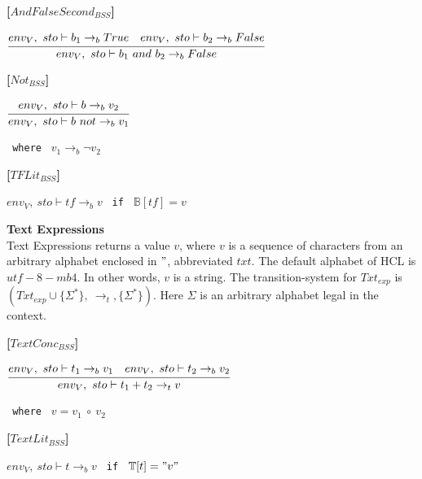 \textbf{[$AndFalseSecond_{BSS}$]}\\
\begin{center}
	\begin{math}
	\cfrac
	{env_V,\ sto \vdash b_1 \rightarrow_b True \quad env_V,\ sto \vdash b_2 \rightarrow_b False}
	{env_V,\ sto \vdash b_1\ and\ b_2 \rightarrow_b False}
	\end{math}
\end{center}

\textbf{[$Not_{BSS}$]}\\
\begin{center}
	\begin{math}
	\cfrac
	{env_V,\ sto \vdash b \rightarrow_b v_2}
	{env_V,\ sto \vdash b\ not \rightarrow_b v_1}
	\end{math}
	
	\texttt{ where } $v_1 \rightarrow_b \neg v_2$
\end{center}

\textbf{[$TFLit_{BSS}$]}\\
\begin{center}
	\begin{math}
	env_V,\ sto \vdash tf \rightarrow_b v
	\end{math}
	\texttt{ if } $\mathbb{B}[tf] = v$
\end{center}

\textbf{\large{Text Expressions}}\\
Text Expressions returns a value $v$, where $v$ is a sequence of characters from an arbitrary alphabet enclosed in $"$, abbreviated $txt$.
The default alphabet of HCL is $utf-8-mb4$.
In other words, $v$ is a string.
The transition-system for $Txt_{exp}$ is $(Txt_{exp} \cup \{\Sigma^*\},\ \rightarrow_t, \{\Sigma^*\})$.
Here $\Sigma$ is an arbitrary alphabet legal in the context.

\textbf{[$TextConc_{BSS}$]}\\
\begin{center}
	\begin{math}
	\cfrac
		{env_V,\ sto \vdash t_1 \rightarrow_b v_1 \quad env_V,\ sto \vdash t_2 \rightarrow_b v_2}
		{env_V,\ sto \vdash t_1 + t_2 \rightarrow_t v}
	\end{math}
	
	\texttt{ where } $v = v_1\ \circ\ v_2$
\end{center}

\textbf{[$TextLit_{BSS}$]}\\
\begin{center}
	\begin{math}
	env_V,\ sto \vdash t \rightarrow_b v
	\end{math}
	\texttt{ if } $\mathbb{T}[t] = "v"$
\end{center}

